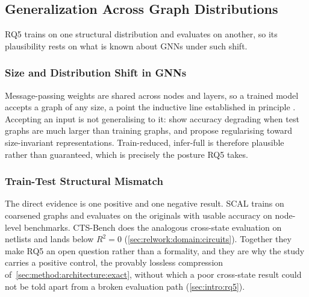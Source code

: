 \subsection{Generalization Across Graph Distributions}
\label{sec:relwork:generalization}
RQ5 trains on one structural distribution and evaluates on another, so its plausibility
rests on what is known about GNNs under such shift.

\subsubsection{Size and Distribution Shift in GNNs}
\label{sec:relwork:generalization:shift}
Message-passing weights are shared across nodes and layers, so a trained model accepts a
graph of any size, a point the inductive line established in principle
\citep{hamilton2017graphsage}. Accepting an input is not generalising to it:
\citet{buffelli2022sizeshift} show accuracy degrading when test graphs are much larger
than training graphs, and propose regularising toward size-invariant representations.
Train-reduced, infer-full is therefore plausible rather than guaranteed, which is
precisely the posture RQ5 takes.

\subsubsection{Train-Test Structural Mismatch}
\label{sec:relwork:generalization:mismatch}
The direct evidence is one positive and one negative result. SCAL \citep{huang2021scal}
trains on coarsened graphs and evaluates on the originals with usable accuracy on
node-level benchmarks. CTS-Bench \citep{cts_bench2026} does the analogous cross-state
evaluation on netlists and lands below $R^2 = 0$
(\ref{sec:relwork:domain:circuits}). Together they make RQ5 an open question rather than
a formality, and they are why the study carries a positive control, the provably lossless
compression of~\ref{sec:method:architecture:exact}, without which a poor cross-state
result could not be told apart from a broken evaluation path (\ref{sec:intro:rq5}).
